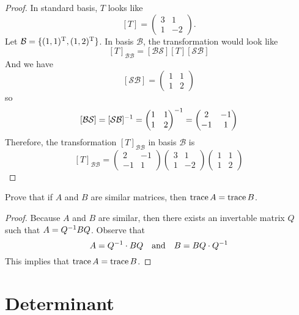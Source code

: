 \begin{proof}
  In standard basis, $T$ looks like
  \[ [T]= \begin{pmatrix} 3 &1\\ 1 &-2 \end{pmatrix}.\]
  Let $\mathcal{B}=\{(1,1)^\mathrm{T}, (1,2)^\mathrm{T}\}$. In basis $\mathcal{B}$,
  the transformation would look like
  \[
    [T]_{\mathcal{BB}}= [\mathcal{BS}] [T] [\mathcal{SB}]
  \]
  And we have
  \[ [\mathcal{SB}]= \begin{pmatrix} 1 &1\\ 1 &2 \end{pmatrix} \]
  so
  \[
    [\mathcal{BS}]= [\mathcal{SB}]^{-1}=
    \begin{pmatrix} 1 &1\\ 1 &2 \end{pmatrix}^{-1}=
    \begin{pmatrix} 2 &-1\\ -1&1 \end{pmatrix}
  \]
  Therefore, the transformation $[T]_{\mathcal{BB}}$ in basis
  $\mathcal{B}$ is
  \[
    [T]_{\mathcal{BB}}=
    \begin{pmatrix} 2 &-1\\ -1&1 \end{pmatrix}
    \begin{pmatrix} 3 &1\\ 1 &-2 \end{pmatrix}
    \begin{pmatrix} 1 &1\\ 1 &2 \end{pmatrix} 
  \]
\end{proof}
\begin{exercise}
  Prove that if $A$ and $B$ are similar matrices, then
  $\operatorname{trace} A=\operatorname{trace} B$.
\end{exercise}
\begin{proof}
  Because $A$ and $B$ are similar, then there exists 
  an invertable matrix $Q$ such that $A=Q^{-1} BQ$. Observe that
  \[
    A=Q^{-1}\cdot BQ
    \quad\text{and}\quad
    B=BQ\cdot Q^{-1}
  \]
  This implies that $\operatorname{trace} A=\operatorname{trace} B$.
\end{proof}

\chapter{Determinant}
\setcounter{section}{2}
